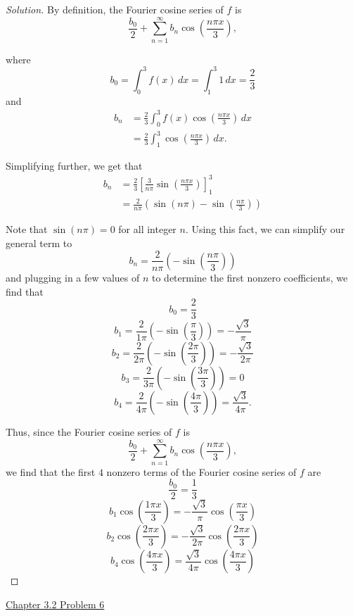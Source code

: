 \documentclass[11pt]{article}
\newenvironment{solution}
  {\renewcommand\qedsymbol{$\blacksquare$}\begin{proof}[Solution]}
  {\end{proof}}
\begin{document}
\begin{solution}
By definition, the Fourier cosine series of $f$ is \[ \frac{b_0}{2} + \sum\limits_{n=1}^{\infty} b_n \cos\left(\frac{n\pi x}{3}\right),\]

where \[b_0 = \int_{0}^{3} f(x) \, dx = \int_{1}^3 1 \, dx = \frac{2}{3}\] and 
\begin{align*} b_n &= \frac{2}{3} \int_0^3 f(x) \cos\left(\frac{n\pi x}{3}\right) \, dx \\
&= \frac{2}{3} \int_1^3 \cos\left(\frac{n\pi x}{3}\right) \, dx.\end{align*}

Simplifying further, we get that \begin{align*}b_n &= \frac{2}{3} \left[ \frac{3}{n\pi} \sin\left( \frac{n\pi x}{3}\right)\right]_1^3 \\ 
&=  \frac{2}{n\pi} \left( \sin(n\pi) - \sin\left( \frac{n\pi}{3}\right)\right)\end{align*}

Note that $\sin(n\pi) = 0$ for all integer $n$. Using this fact, we can simplify our general term to
\[ b_n = \frac{2}{n\pi} \left( -\sin\left( \frac{n\pi}{3}\right)\right)\]and plugging in a few values of $n$ to determine the first nonzero coefficients, we find that
\[b_0 = \frac{2}{3}\]
\[b_1 = \frac{2}{1\pi}\left( -\sin\left(\frac{\pi}{3}\right) \right) = -\frac{\sqrt{3}}{\pi}\]
\[b_2 = \frac{2}{2\pi}\left( -\sin\left(\frac{2\pi}{3}\right) \right) = -\frac{\sqrt{3}}{2\pi}\]
\[b_3 = \frac{2}{3\pi}\left( -\sin\left(\frac{3\pi}{3}\right) \right) = 0\]
\[b_4 = \frac{2}{4\pi}\left( -\sin\left(\frac{4\pi}{3}\right) \right) = \frac{\sqrt{3}}{4\pi}.\]

Thus, since the Fourier cosine series of $f$ is \[ \frac{b_0}{2} + \sum\limits_{n=1}^{\infty} b_n \cos\left(\frac{n\pi x}{3}\right),\] we find that the first $4$ nonzero terms of the Fourier cosine series of $f$ are
\[ \frac{b_0}{2} = \boxed{\frac{1}{3}} \]
\[ b_1\cos\left( \frac{1\pi x}{3}\right) = \boxed{-\frac{\sqrt{3}}{\pi}\cos\left(\frac{\pi x}{3}\right)}\]
\[ b_2\cos\left( \frac{2\pi x}{3}\right) = \boxed{-\frac{\sqrt{3}}{2\pi}\cos\left(\frac{2\pi x}{3}\right)}\]
\[ b_4\cos\left( \frac{4\pi x}{3}\right) = \boxed{\frac{\sqrt{3}}{4\pi}\cos\left(\frac{4\pi x}{3}\right)}\]

\end{solution}

\newpage

\underline{Chapter 3.2 Problem 6} \\
\end{document}
